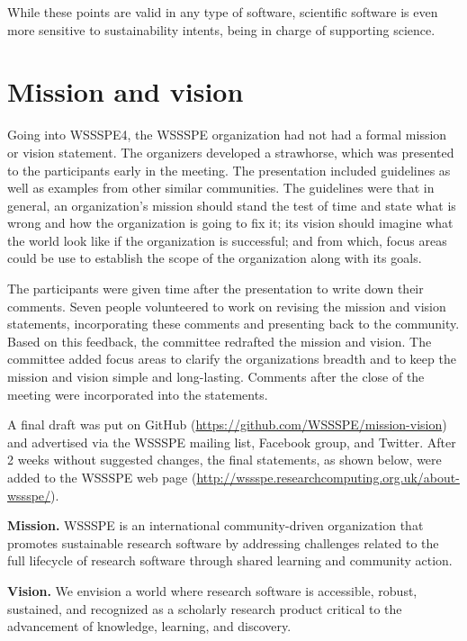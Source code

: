 \documentclass[11pt, oneside]{amsart}
\newcommand{\note}[1]{ {\textcolor{blueish}    { ***Note:      #1 }}}
\begin{document}
While these points are valid in any type of software, scientific software is even more sensitive to sustainability intents, being in charge of supporting science.


\section{Mission and vision}\label{sec:mission}


Going into WSSSPE4, the WSSSPE organization had not had a formal mission or vision statement.
The organizers developed a strawhorse, which was presented to the participants early in the meeting.
The presentation included guidelines as well as examples from other similar communities.
The guidelines were that in general, an organization's mission should stand the test of time and state what is wrong and how the organization is going to fix it; its vision should imagine what the world look like if the organization is successful; and from which, focus areas could be use to establish the scope of the organization along with its goals.

The participants were given time after the presentation to write down their comments.
Seven people volunteered to work on revising the mission and vision statements, incorporating these comments and presenting back to the community.
Based on this feedback, the committee redrafted the mission and vision.
The committee added focus areas to clarify the organizations breadth and to keep the mission and vision simple and long-lasting.
Comments after the close of the meeting were incorporated into the statements.

A final draft was put on GitHub (\url{https://github.com/WSSSPE/mission-vision}) and advertised
via the WSSSPE mailing list, Facebook group, and Twitter.
After 2 weeks without suggested changes, the final statements, as shown below, were added
to the WSSSPE web page (\url{http://wssspe.researchcomputing.org.uk/about-wssspe/}).

{\bf Mission.}
WSSSPE is an international community-driven organization that promotes sustainable research software by addressing challenges related to the full lifecycle of research software through shared learning and community action.

{\bf Vision.}
We envision a world where research software is accessible, robust, sustained, and recognized as a scholarly research product critical to the advancement of knowledge, learning, and discovery.
\end{document}
